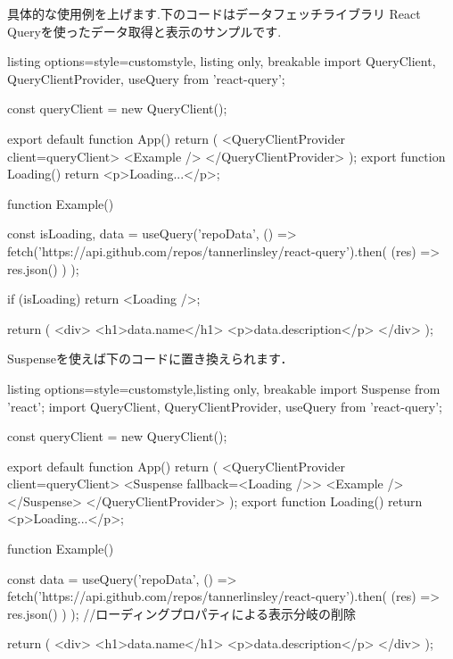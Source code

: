 具体的な使用例を上げます.下のコードはデータフェッチライブラリ React Queryを使ったデータ取得と表示のサンプルです.






\begin{tcblisting}{listing options={style=customstyle}, listing only, breakable}
  import { QueryClient, QueryClientProvider, useQuery } from 'react-query';

  const queryClient = new QueryClient();

  export default function App() {
  return (
  <QueryClientProvider client={queryClient}>
  <Example />
  </QueryClientProvider>
  );
  }
  export function Loading() {
      return <p>Loading...</p>;
    }

  function Example() {
      const { isLoading, data } = useQuery('repoData', () =>
      fetch('https://api.github.com/repos/tannerlinsley/react-query').then(
      (res) => res.json()
      )
      );

      if (isLoading) return <Loading />;

      return (
      <div>
        <h1>{data.name}</h1>
        <p>{data.description}</p>
      </div>
      );
    }
\end{tcblisting}




Suspenseを使えば下のコードに置き換えられます．


\begin{tcblisting}{listing options={style=customstyle},listing only, breakable}
  import { Suspense } from 'react';
  import { QueryClient, QueryClientProvider, useQuery } from 'react-query';

  const queryClient = new QueryClient();

  export default function App() {
  return (
  <QueryClientProvider client={queryClient}>
  <Suspense fallback={<Loading />}>
  <Example />
  </Suspense>
  </QueryClientProvider>
  );
  }
  export function Loading() {
      return <p>Loading...</p>;
    }

  function Example() {
      const { data } = useQuery('repoData', () =>
      fetch('https://api.github.com/repos/tannerlinsley/react-query').then(
      (res) => res.json()
      )
      );
      //ローディングプロパティによる表示分岐の削除

      return (
      <div>
        <h1>{data.name}</h1>
        <p>{data.description}</p>
      </div>
      );
    }
\end{tcblisting}





